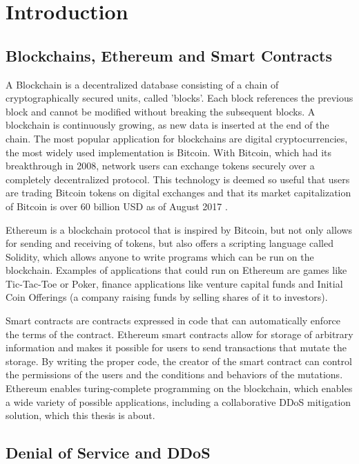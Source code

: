 \chapter{Introduction}

\section{Blockchains, Ethereum and Smart Contracts}

A Blockchain is a decentralized database consisting of a chain of cryptographically secured units, called 'blocks'. Each block references the previous block and cannot be modified without breaking the subsequent blocks. A blockchain is continuously growing, as new data is inserted at the end of the chain.
The most popular application for blockchains are digital cryptocurrencies, the most widely used implementation is Bitcoin. With Bitcoin, which had its breakthrough in 2008, network users can exchange tokens securely over a completely decentralized protocol. This technology is deemed so useful that users are trading Bitcoin tokens on digital exchanges and that its market capitalization of Bitcoin is over 60 billion USD as of August 2017 \cite{BitcoinMarketCap}.
 
Ethereum \cite{Ethereum} is a blockchain protocol that is inspired by Bitcoin, but not only allows for sending and receiving of tokens, but also offers a scripting language called Solidity, which allows anyone to write programs which can be run on the blockchain. Examples of applications that could run on Ethereum are games like Tic-Tac-Toe or Poker, finance applications like venture capital funds and Initial Coin Offerings (a company raising funds by selling shares of it to investors).

Smart contracts are contracts expressed in code that can automatically enforce the terms of the contract. Ethereum smart contracts allow for storage of arbitrary information and makes it possible for users to send transactions that mutate the storage. By writing the proper code, the creator of the smart contract can control the permissions of the users and the conditions and behaviors of the mutations. Ethereum enables turing-complete programming on the blockchain, which enables a wide variety of possible applications, including a collaborative DDoS mitigation solution, which this thesis is about.

\section{Denial of Service and DDoS}

